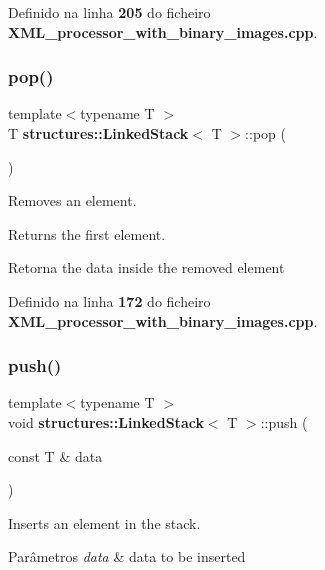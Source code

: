 Definido na linha \textbf{ 205} do ficheiro \textbf{ X\+M\+L\+\_\+processor\+\_\+with\+\_\+binary\+\_\+images.\+cpp}.

\mbox{\label{classstructures_1_1_linked_stack_a8ff0ba0de594ec26971bb259e1d28c3c}} 
\subsubsection{pop()}
{\footnotesize\ttfamily template$<$typename T $>$ \\
T \textbf{ structures\+::\+Linked\+Stack}$<$ T $>$\+::pop (\begin{DoxyParamCaption}{ }\end{DoxyParamCaption})}



Removes an element. 

Returns the first element.

\begin{DoxyReturn}{Retorna}
the data inside the removed element 
\end{DoxyReturn}


Definido na linha \textbf{ 172} do ficheiro \textbf{ X\+M\+L\+\_\+processor\+\_\+with\+\_\+binary\+\_\+images.\+cpp}.

\mbox{\label{classstructures_1_1_linked_stack_adb8c6b231298ac25b17ba692d510a3fc}} 
\subsubsection{push()}
{\footnotesize\ttfamily template$<$typename T $>$ \\
void \textbf{ structures\+::\+Linked\+Stack}$<$ T $>$\+::push (\begin{DoxyParamCaption}\item[{const T \&}]{data }\end{DoxyParamCaption})}



Inserts an element in the stack. 


\begin{DoxyParams}{Parâmetros}
{\em data} & data to be inserted \\
\hline
\end{DoxyParams}



